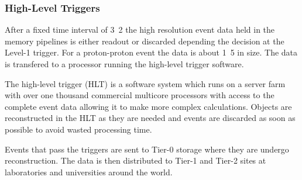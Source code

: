 \subsubsection{High-Level Triggers}
After a fixed time interval of \unit{3.2}{\micro\second} the high resolution
event data held in the memory pipelines is either readout or discarded depending
the decision at the Level-1 trigger. For a proton-proton event
the data is about \unit{1.5}{\mega\bel} in size.
The data is transfered to a processor running the high-level trigger software.

The high-level trigger (HLT) is a software system which runs on a server farm with
over one thousand commercial multicore processors with access to the complete
event data allowing it to make more complex calculations. 
Objects are reconstructed in the HLT as they are needed and events are discarded
as soon as possible to avoid wasted processing time.

Events that pass the triggers are sent to Tier-0 storage where they are
undergo reconstruction. The data is then distributed to Tier-1 and Tier-2 sites
at laboratories and universities around the world.

